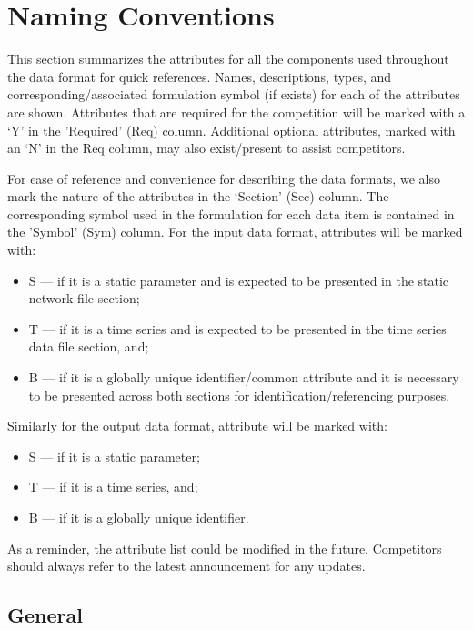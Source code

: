\documentclass{article}
\begin{document}
\section{Naming Conventions}
\label{sec:naming}
This section summarizes the attributes for all the components used throughout the data format for quick references.
Names, descriptions, types, and corresponding/associated formulation symbol (if exists) for each of the attributes are shown.
Attributes that are required for the competition
will be marked with a `Y' in the 'Required' (Req) column.
Additional optional attributes, marked with an `N' in the Req column, may also exist/present to assist competitors.

For ease of reference and convenience for describing the data formats, we also
mark the nature of the attributes in the `Section' (Sec) column. The corresponding symbol used in the formulation for each data item is contained in the 'Symbol' (Sym) column.
For the input data format, attributes will be marked with:
\begin{itemize}
\item S --- if it is a static parameter and is expected to be presented in the static network file section;
\item T --- if it is a time series and is expected to be presented in the time series data file section, and;
\item B --- if it is a globally unique identifier/common attribute and it is necessary to be presented across both sections for identification/referencing purposes.
\end{itemize}
Similarly for the output data format, attribute will be marked with:
\begin{itemize}
\item S --- if it is a static parameter;
\item T --- if it is a time series, and;
\item B --- if it is a globally unique identifier.
\end{itemize}
As a reminder, the attribute list could be modified in the future.
Competitors should always refer to the latest announcement for any
updates.





\subsection{General}
\label{nom:top-level}
\end{document}

